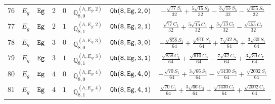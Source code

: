 \documentclass[fleqn,8pt]{jsarticle}
\begin{document}
\begin{table}[ht!]
\begin{center}
\begin{tabular}{cccccccc}
$ 76 $ & $ E_{g} $ & $ {\tt Eg} $ & $ 2 $ & $ 0 $ & $ \mathbb{Q}_{8,0}^{(h,E_{g},2)} $ & $ {\tt Qh(8,Eg,2,0)} $ & $ - \frac{\sqrt{77} S_{1}}{32} + \frac{5 \sqrt{15} S_{3}}{32} - \frac{3 \sqrt{13} S_{5}}{32} - \frac{\sqrt{455} S_{7}}{32} $ \\
$ 77 $ & $ E_{g} $ & $ {\tt Eg} $ & $ 2 $ & $ 1 $ & $ \mathbb{Q}_{8,1}^{(h,E_{g},2)} $ & $ {\tt Qh(8,Eg,2,1)} $ & $ \frac{\sqrt{77} C_{1}}{32} + \frac{5 \sqrt{15} C_{3}}{32} + \frac{3 \sqrt{13} C_{5}}{32} - \frac{\sqrt{455} C_{7}}{32} $ \\
$ 78 $ & $ E_{g} $ & $ {\tt Eg} $ & $ 3 $ & $ 0 $ & $ \mathbb{Q}_{8,0}^{(h,E_{g},3)} $ & $ {\tt Qh(8,Eg,3,0)} $ & $ - \frac{\sqrt{858} S_{1}}{64} + \frac{\sqrt{910} S_{3}}{64} + \frac{7 \sqrt{42} S_{5}}{64} + \frac{3 \sqrt{30} S_{7}}{64} $ \\
$ 79 $ & $ E_{g} $ & $ {\tt Eg} $ & $ 3 $ & $ 1 $ & $ \mathbb{Q}_{8,1}^{(h,E_{g},3)} $ & $ {\tt Qh(8,Eg,3,1)} $ & $ \frac{\sqrt{858} C_{1}}{64} + \frac{\sqrt{910} C_{3}}{64} - \frac{7 \sqrt{42} C_{5}}{64} + \frac{3 \sqrt{30} C_{7}}{64} $ \\
$ 80 $ & $ E_{g} $ & $ {\tt Eg} $ & $ 4 $ & $ 0 $ & $ \mathbb{Q}_{8,0}^{(h,E_{g},4)} $ & $ {\tt Qh(8,Eg,4,0)} $ & $ - \frac{\sqrt{70} S_{1}}{64} + \frac{3 \sqrt{66} S_{3}}{64} - \frac{\sqrt{1430} S_{5}}{64} + \frac{\sqrt{2002} S_{7}}{64} $ \\
$ 81 $ & $ E_{g} $ & $ {\tt Eg} $ & $ 4 $ & $ 1 $ & $ \mathbb{Q}_{8,1}^{(h,E_{g},4)} $ & $ {\tt Qh(8,Eg,4,1)} $ & $ \frac{\sqrt{70} C_{1}}{64} + \frac{3 \sqrt{66} C_{3}}{64} + \frac{\sqrt{1430} C_{5}}{64} + \frac{\sqrt{2002} C_{7}}{64} $ \\
 \hline \hline
\end{tabular}
\end{center}
\end{table}
\end{document}

